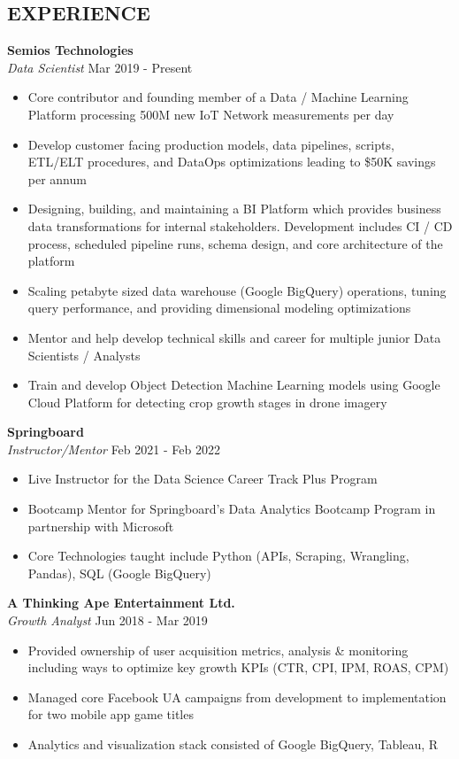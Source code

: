 \documentclass[margin]{res}
\begin{document}
\begin{resume}

\section{EXPERIENCE}

\textbf{Semios Technologies }
    \\ {\sl Data Scientist} \hfill{Mar 2019 - Present} 

\begin{itemize}
  \item Core contributor and founding member of a Data / Machine Learning Platform processing 500M new IoT Network measurements per day
  \item Develop customer facing production models, data pipelines, scripts, ETL/ELT procedures, and DataOps optimizations leading to \$50K savings per annum
  \item Designing, building, and maintaining a BI Platform which provides business data transformations for internal stakeholders. Development includes CI / CD process, scheduled pipeline runs, schema design, and core architecture of the platform
  \item Scaling petabyte sized data warehouse (Google BigQuery) operations, tuning query performance, and providing dimensional modeling optimizations
  \item Mentor and help develop technical skills and career for multiple junior Data Scientists / Analysts
  \item Train and develop Object Detection Machine Learning models using Google Cloud Platform for detecting crop growth stages in drone imagery
\end{itemize}

\textbf{Springboard} 
    \\ {\sl Instructor/Mentor} \hfill{Feb 2021 - Feb 2022}
\begin{itemize}
    \item Live Instructor for the Data Science Career Track Plus Program
    \item Bootcamp Mentor for Springboard's Data Analytics Bootcamp Program in partnership with Microsoft
    \item Core Technologies taught include Python (APIs, Scraping, Wrangling, Pandas), SQL (Google BigQuery)
\end{itemize}

\textbf{A Thinking Ape Entertainment Ltd.} 
    \\ {\sl Growth Analyst} \hfill{Jun 2018 - Mar 2019}
\begin{itemize}
  \item Provided ownership of user acquisition metrics, analysis \& monitoring including ways to optimize key growth KPIs (CTR, CPI, IPM, ROAS, CPM)
  \item Managed core Facebook UA campaigns from development to implementation for two mobile app game titles
  \item Analytics and visualization stack consisted of Google BigQuery, Tableau, R
\end{itemize}


\end{resume}
\end{document}
